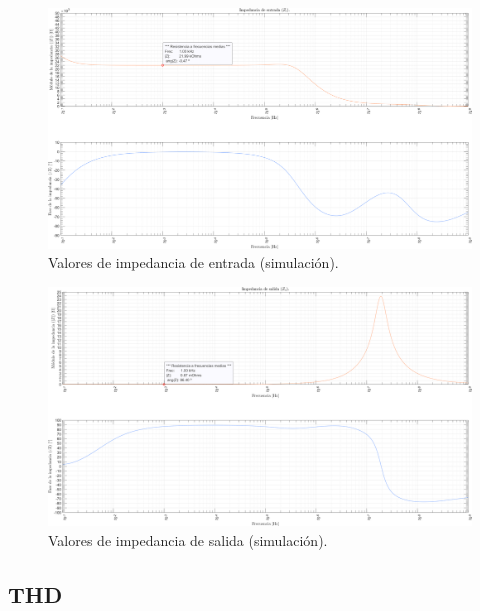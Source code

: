 \vfill

\clearpage

\begin{figure}[H]
    \centering
    \includegraphics[height=0.66 \textwidth, angle=90]{./img/simulaciones/Impedance/amplifier_Zi.png}
    \caption{Valores de impedancia de entrada (simulación).}
    \label{fig:amplifier_Zi_sim}
\end{figure}

\clearpage

\begin{figure}[H]
    \centering
    \includegraphics[height=0.66 \textwidth, angle=90]{./img/simulaciones/Impedance/amplifier_Zo.png}
    \caption{Valores de impedancia de salida (simulación).}
    \label{fig:amplifier_Zo_sim}
\end{figure}

\clearpage

\subsection{THD}

